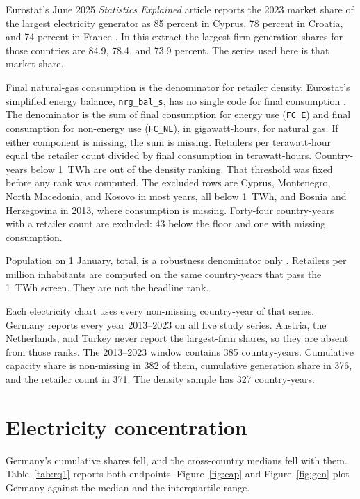 \documentclass[11pt,a4paper]{article}
\begin{document}
Eurostat's June 2025 \emph{Statistics Explained} article reports the 2023 market share of the largest electricity generator as 85 percent in Cyprus, 78 percent in Croatia, and 74 percent in France \citep{eurostat2025explained}. In this extract the largest-firm generation shares for those countries are 84.9, 78.4, and 73.9 percent. The series used here is that market share.

Final natural-gas consumption is the denominator for retailer density. Eurostat's simplified energy balance, \texttt{nrg\_bal\_s}, has no single code for final consumption \citep{eurostat2026balances}. The denominator is the sum of final consumption for energy use (\texttt{FC\_E}) and final consumption for non-energy use (\texttt{FC\_NE}), in gigawatt-hours, for natural gas. If either component is missing, the sum is missing. Retailers per terawatt-hour equal the retailer count divided by final consumption in terawatt-hours. Country-years below 1~TWh are out of the density ranking. That threshold was fixed before any rank was computed. The excluded rows are Cyprus, Montenegro, North Macedonia, and Kosovo in most years, all below 1~TWh, and Bosnia and Herzegovina in 2013, where consumption is missing. Forty-four country-years with a retailer count are excluded: 43 below the floor and one with missing consumption.

Population on 1 January, total, is a robustness denominator only \citep{eurostat2026population}. Retailers per million inhabitants are computed on the same country-years that pass the 1~TWh screen. They are not the headline rank.

Each electricity chart uses every non-missing country-year of that series. Germany reports every year 2013--2023 on all five study series. Austria, the Netherlands, and Turkey never report the largest-firm shares, so they are absent from those ranks. The 2013--2023 window contains 385 country-years. Cumulative capacity share is non-missing in 382 of them, cumulative generation share in 376, and the retailer count in 371. The density sample has 327 country-years.

\section{Electricity concentration}

Germany's cumulative shares fell, and the cross-country medians fell with them. Table~\ref{tab:rq1} reports both endpoints. Figure~\ref{fig:cap} and Figure~\ref{fig:gen} plot Germany against the median and the interquartile range.
\end{document}
